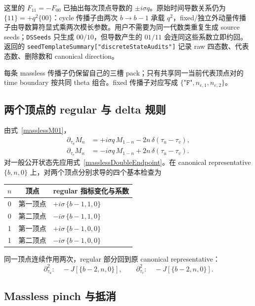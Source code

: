 ﻿\documentclass[a4paper,11pt]{article}
\begin{document}
这里的 $F_{11}=-F_{00}$ 已抽出每次顶点导数的 $\pm i\sigma q$。原始时间导数关系仍为 $\{11\}=+q^2\{00\}$：cycle 传播子由两次 $b\to b-1$ 承载 $q^2$，fixed/独立外动量传播子由导数算符显式乘两次模长参数。用户不需要为同一代数类重复生成 source seeds；\texttt{DSSeeds} 只生成 $00/10$，但导数产生的 $01/11$ 会连同这些系数立即约回。返回的 \texttt{seedTemplateSummary["discreteStateAudits"]} 记录 raw 四态数、代表态数、删除数和 canonical direction。

每条 massless 传播子仍保留自己的三槽 pack；只有共享同一当前代表顶点对的 time boundary 按共同 theta 组合。fixed 传播子对应写成 $\{\texttt{"F"},n_{e,1},n_{e,2}\}$。

\subsection{两个顶点的 regular 与 delta 规则}

由式~\eqref{masslessM01}，
\begin{align}
 \partial_{\tau_u}M_n
 &=+i\sigma q\,M_{1-n}
   -2n\,\delta(\tau_u-\tau_v),\\
 \partial_{\tau_v}M_n
 &=-i\sigma q\,M_{1-n}
   +2n\,\delta(\tau_u-\tau_v).
 \label{masslessTimeRules}
\end{align}
对一般公开状态先应用式~\eqref{masslessDoubleEndpoint}。在 canonical representative $\{b,n,0\}$ 上，对两个顶点分别求导的四个基本检查为
\begin{center}
\begin{tabular}{ccl}
\toprule
$n$ & 顶点 & regular 指标变化与系数\\
\midrule
0 & 第一顶点 & $+i\sigma\,\{b-1,1,0\}$\\
0 & 第二顶点 & $-i\sigma\,\{b-1,1,0\}$\\
1 & 第一顶点 & $+i\sigma\,\{b-1,0,0\}$\\
1 & 第二顶点 & $-i\sigma\,\{b-1,0,0\}$\\
\bottomrule
\end{tabular}
\end{center}
同一顶点连续作用两次，regular 部分回到原 canonical representative：
\begin{equation}
 \partial_{\tau_u}^2:\quad
 -J[\{b-2,n,0\}],
 \qquad
 \partial_{\tau_v}^2:\quad
 -J[\{b-2,n,0\}].
\end{equation}

\subsection{Massless pinch 与抵消}
\end{document}
